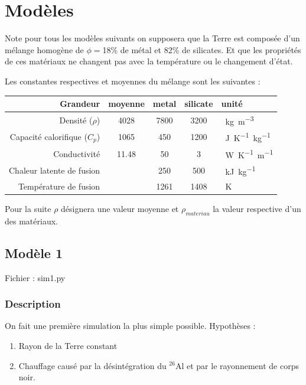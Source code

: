 \documentclass[10pt,a4paper]{article}
\numberwithin{equation}{section}
\begin{document}
\section{Modèles}

Note pour tous les modèles suivants on supposera que la Terre est composée d'un mélange homogène de $\phi = $18\% de métal et 82\% de silicates. Et que les propriétés de ces matériaux ne changent pas avec la température ou le changement d'état.

Les constantes respectives et moyennes du mélange sont les suivantes :
\tabulinesep=0.3mm
\begin{center}
  \begin{tabu}{ r | c c c l}
    Grandeur & moyenne & metal & silicate & unité\\ \hline
    Densité ($\rho$) & 4028 & 7800 &  3200 & \SI{}{kg.m^{-3}}\\ \hline
    Capacité calorifique ($C_p$) & 1065 & 450 & 1200 &  \SI{}{J.K^{-1}.kg^{-1}} \\ \hline
    Conductivité & 11.48 & 50 & 3 & \SI{}{W.K^{-1}.m^{-1}}  \\ \hline    
    Chaleur latente de fusion & & 250 & 500 & \SI{}{kJ.kg^{-1}}\\ \hline
    Température de fusion & & 1261 & 1408 & \SI{}{K}\\ \hline

  \end{tabu}
\end{center}

Pour la suite $\rho$ désignera une valeur moyenne et $\rho_{materiau}$ la valeur respective d'un des matériaux.


\subsection{Modèle 1}

Fichier : sim1.py

\subsubsection{Description}

On fait une première simulation la plus simple possible.
Hypothèses : 
\begin{enumerate}
\item Rayon de la Terre constant 
\item Chauffage causé par la désintégration du $^{26}$Al et par le rayonnement de corps noir.
\end{enumerate}
\end{document}
